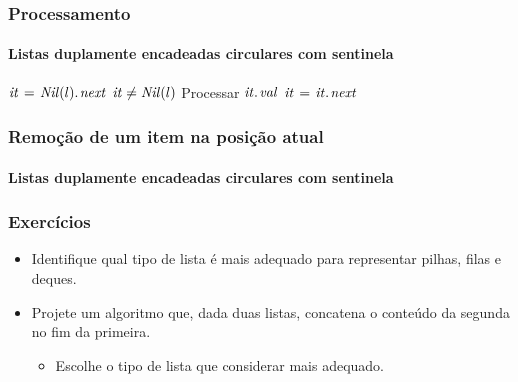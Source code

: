 \documentclass{beamer}
\begin{document}
\begin{frame}
  \frametitle{Processamento}
  \framesubtitle{Listas duplamente encadeadas circulares com sentinela}

  \begin{codebox}
    \zi $\id{it} \gets \attrib{\id{Nil}(l)}{next}$
    \zi \While $\id{it} \neq \id{Nil}(l)$
    \zi   \Do \Comment Processar $\attrib{\id{it}}{val}$
    \zi       $\id{it} \gets \attrib{\id{it}}{next}$
          \End
  \end{codebox}

\end{frame}

\begin{frame}
  \frametitle{Remoção de um item na posição atual}
  \framesubtitle{Listas duplamente encadeadas circulares com sentinela}

  \begin{codebox}
    \zi {}
    \zi {}
    \zi {}
  \end{codebox}


\end{frame}

\begin{frame}

  \frametitle{Exercícios}

  \begin{itemize}
    \item Identifique qual tipo de lista é mais adequado para representar pilhas, filas e deques.
    \item Projete um algoritmo que, dada duas listas, concatena o conteúdo da segunda no fim da primeira.
      \begin{itemize}
        \item Escolhe o tipo de lista que considerar mais adequado.
      \end{itemize}
  \end{itemize}
\end{frame}
\end{document}
